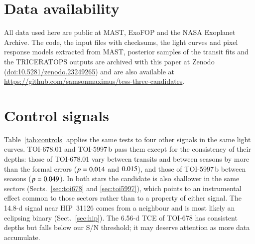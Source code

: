 \documentclass[twocolumn,numberedappendix,appendixfloats]{openjournal}
\begin{document}
\newpage
\section*{Data availability}
All data used here are public at MAST, ExoFOP and the NASA Exoplanet Archive.
The code, the input files with checksums, the light curves and pixel response
models extracted from MAST, posterior samples of the transit fits and the
TRICERATOPS outputs are archived with this paper at Zenodo
(\href{https://doi.org/10.5281/zenodo.23249265}{doi:10.5281/zenodo.23249265}) and are also available at
\url{https://github.com/samsonmaximus/tess-three-candidates}.




\appendix


\section{Control signals}
\label{app:controls}

Table~\ref{tab:controls} applies the same tests to four other signals in the
same light curves. TOI-678.01 and TOI-5997\,b pass them except for the
consistency of their depths: those of TOI-678.01 vary between transits and
between seasons by more than the formal errors ($p = 0.014$ and $0.015$),
and those of TOI-5997\,b between seasons ($p = 0.049$). In both stars the
candidate is also shallower in the same sectors (Sects.~\ref{sec:toi678} and
\ref{sec:toi5997}), which points to an instrumental effect common to those
sectors rather than to a property of either signal. The 14.8-d signal near
HIP~31126 comes from a neighbour and is most likely an eclipsing binary
(Sect.~\ref{sec:hip}). The
6.56-d TCE of TOI-678 has consistent depths but falls below our S/N threshold;
it may deserve attention as more data accumulate.
\end{document}
